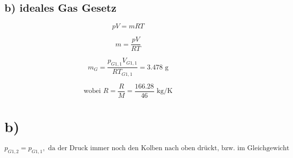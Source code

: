 \subsection*{b) ideales Gas Gesetz}

\[
pV = mRT
\]

\[
\boxed{m = \frac{pV}{RT}}
\]

\[
\boxed{m_{G} = \frac{p_{G1,1} V_{G1,1}}{R T_{G1,1}} = 3.478 \text{ g}}
\]

\[
\text{wobei } R = \frac{R}{M} = \frac{166.28}{46} \text{ kg/K}
\]



\section*{b)}

\[
p_{G1,2} = p_{G1,1}, \text{ da der Druck immer noch den Kolben nach oben drückt, bzw. im Gleichgewicht ist}
\]